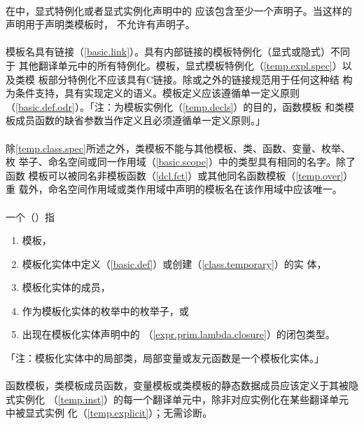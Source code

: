 \paragraph{}
在中，显式特例化或者显式实例化声明中的
应该包含至少一个声明子。当这样的声明用于声明类模板时，
不允许有声明子。

\paragraph{}
模板名具有链接（\ref{basic.link}）。具有内部链接的模板特例化（显式或隐式）不同于
其他翻译单元中的所有特例化。模板，显式模板特例化（\ref{temp.expl.spec}）以及类模
板部分特例化不应该具有C链接。除或之外的链接规范用于任何这种结
构为条件支持，具有实现定义的语义。模板定义应该遵循单一定义原则
（\ref{basic.def.odr}）。「注：为模板实例化（\ref{temp.decls}）的目的，函数模板
和类模板成员函数的缺省参数当作定义且必须遵循单一定义原则。」

\paragraph{}
除\ref{temp.class.spec}所述之外，类模板不能与其他模板、类、函数、变量、枚举、枚
举子、命名空间或同一作用域（\ref{basic.scope}）中的类型具有相同的名字。除了函数
模板可以被同名非模板函数（\ref{dcl.fct}）或其他同名函数模板（\ref{temp.over}）重
载外，命名空间作用域或类作用域中声明的模板名在该作用域中应该唯一。

\paragraph{}
一个（）指
\begin{enumerate}
  \item{模板，}
  \item{模板化实体中定义（\ref{basic.def}）或创建（\ref{class.temporary}）的实
    体，}
  \item{模板化实体的成员，}
  \item{作为模板化实体的枚举中的枚举子，或}
  \item{出现在模板化实体声明中的
    （\ref{expr.prim.lambda.closure}）的闭包类型。}
\end{enumerate}
「注：模板化实体中的局部类，局部变量或友元函数是一个模板化实体。」

\paragraph{}
函数模板，类模板成员函数，变量模板或类模板的静态数据成员应该定义于其被隐式实例化
（\ref{temp.inst}）的每一个翻译单元中，除非对应实例化在某些翻译单元中被显式实例
化（\ref{temp.explicit}）；无需诊断。

